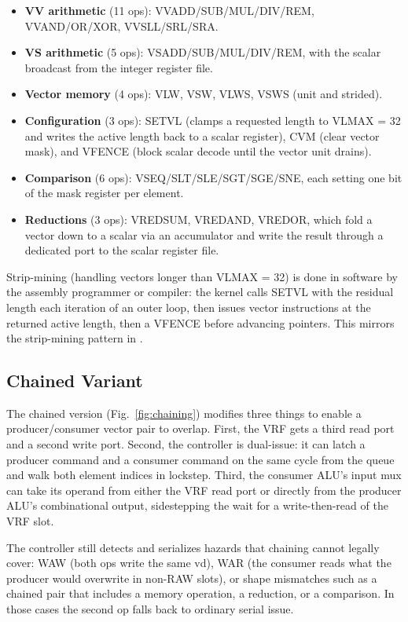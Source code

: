 \documentclass[conference]{IEEEtran}
\begin{document}
\begin{itemize}
\item \textbf{VV arithmetic} (11 ops): VVADD/SUB/MUL/DIV/REM,
  VVAND/OR/XOR, VVSLL/SRL/SRA.
\item \textbf{VS arithmetic} (5 ops): VSADD/SUB/MUL/DIV/REM, with
  the scalar broadcast from the integer register file.
\item \textbf{Vector memory} (4 ops): VLW, VSW, VLWS, VSWS (unit and
  strided).
\item \textbf{Configuration} (3 ops): SETVL (clamps a requested
  length to VLMAX = 32 and writes the active length back to a scalar
  register), CVM (clear vector mask), and VFENCE (block scalar
  decode until the vector unit drains).
\item \textbf{Comparison} (6 ops): VSEQ/SLT/SLE/SGT/SGE/SNE, each
  setting one bit of the mask register per element.
\item \textbf{Reductions} (3 ops): VREDSUM, VREDAND, VREDOR, which
  fold a vector down to a scalar via an accumulator and write the
  result through a dedicated port to the scalar register file.
\end{itemize}

Strip-mining (handling vectors longer than VLMAX = 32) is done in
software by the assembly programmer or compiler: the kernel calls SETVL with the residual length each
iteration of an outer loop, then issues vector instructions at the
returned active length, then a VFENCE before advancing pointers.
This mirrors the strip-mining pattern in \cite[\S 4.2]{hp_book}.

\subsection{Chained Variant}
The chained version (Fig.~\ref{fig:chaining}) modifies three things
to enable a producer/consumer vector pair to overlap. First, the VRF
gets a third read port and a second write port. Second, the controller
is dual-issue: it can latch a producer command and a consumer command
on the same cycle from the queue and walk both element indices in
lockstep. Third, the consumer ALU's input mux can take its operand
from either the VRF read port or directly from the producer ALU's
combinational output, sidestepping the wait for a write-then-read of
the VRF slot.

The controller still detects and serializes hazards that chaining
cannot legally cover: WAW (both ops write the same vd), WAR (the
consumer reads what the producer would overwrite in non-RAW slots),
or shape mismatches such as a chained pair that includes a memory
operation, a reduction, or a comparison. In those cases the second
op falls back to ordinary serial issue.
\end{document}
